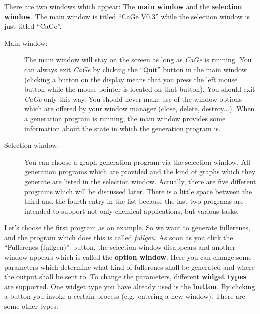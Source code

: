 \documentclass[a4paper]{article}
\def\CaGe{\textit{CaGe}}
\begin{document}
There are two windows which appear: The \textbf{main window} and the
\textbf{selection window}. The main window is titled ``CaGe V0.3'' while
the selection window is just titled ``CaGe''.
\begin{description}
\item[Main window:] The main window will stay
on the screen as long as \CaGe{} is running. You can always exit \CaGe{}
by clicking the ``Quit'' button in the main window (clicking a button on
the display means that you press the left
mouse button while the mouse pointer is located on that button). 
You should exit
\CaGe{} only this way. 
You should never make use of the window options which are
offered by your window manager (close, delete, destroy...). When a 
generation program is running, the main window provides some information
about the state in which the generation program is.
\item[Selection window:] You can choose a graph generation program via the
selection window. All generation programs which are provided and the kind of
graphs which they generate are listed in
the selection window. Actually, there are five different programs which will
be discussed later. There is a little space between the third and the fourth
entry in the list because the last two programs are intended to
support not only chemical applications, but various tasks. 
\end{description}
Let's choose the first program as an example. So we want to generate
fullerenes, and the program which does this is called \textit{fullgen}. 
As soon as
you click the ``Fullerenes (fullgen)''--button, the selection window 
disappears and another window appears which is called the \textbf{option
window}. Here you can change some parameters which determine what kind of
fullerenes shall be generated and where the output shall be sent to.
To change the parameters, different \textbf{widget types} are supported. 
One widget type you have already used is the \textbf{button}. By clicking
a button you invoke a certain process (e.g.~entering a new window). There are
some other types:
\end{document}
